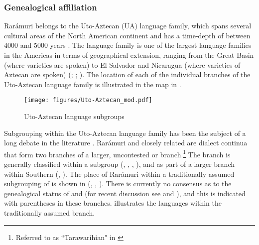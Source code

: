 \subsubsection{Genealogical affiliation}
\label{subsubsec: genertic affiliation}

Rarámuri belongs to the {Uto-Aztecan} (UA) language family, which spans several cultural areas of the North American continent and has a time-depth of between 4000 and 5000 years \citep{campbell2000american,fowler1983some,hill2010dating,silver1998american}. The  language family is one of the largest language families in the Americas in terms of geographical extension, ranging from the Great Basin (where  varieties are spoken) to El Salvador and Nicaragua (where varieties of Aztecan are spoken) (\citealt{miller1984classification}; \citealt{campbell2000american}; \citealt{mithun2001languages}). The location of each of the individual branches of the {Uto-Aztecan} language family is illustrated in the map in .

\begin{figure}
\texttt{[image: figures/Uto-Aztecan\_mod.pdf]}
\caption{
\label{fig: UA languages}
{Uto-Aztecan} language subgroups}%
\end{figure}

Subgrouping within the {Uto-Aztecan} language family has been the subject of a long debate in the literature \citep{hill2011subgrouping}. Rarámuri and closely related  are dialect continua that form two branches of a larger, uncontested  or  branch.\footnote{Referred to as ``Tarawarihian" in \citet{merrill2014ralamuli}} The  branch is generally classified within a  subgroup (\citealt{langacker1977uto}, \citealt{campbell2000american}, \citealt{mithun2001languages}, \citealt{miller1984classification}), and as part of a larger  branch within Southern  (\citealt{miller1984classification}, \citealt{hill2001proto}). The place of Rarámuri within a traditionally assumed subgrouping of  is shown in  (\citealt{campbell2000american}, \citealt{mithun2001languages}, \citealt{hill2011subgrouping}). There is currently no consensus as to the genealogical status of  and  (for recent discussion see \citealt{hill2011subgrouping} and \citealt{merrill2013genetic}), and this is indicated with parentheses in these branches.  illustrates the languages within the traditionally assumed  branch.

